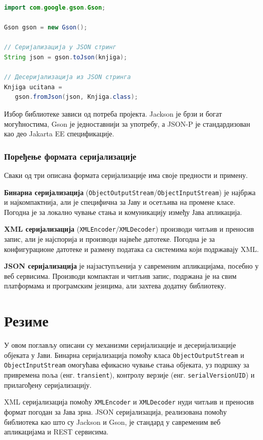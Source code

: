 \begin{lstlisting}[language=Java]
import com.google.gson.Gson;
 
Gson gson = new Gson();
 
// Серијализација у JSON стринг
String json = gson.toJson(knjiga);
 
// Десеријализација из JSON стринга
Knjiga ucitana =
   gson.fromJson(json, Knjiga.class);
\end{lstlisting}


Избор библиотеке зависи од потреба пројекта. Jackson је брзи и богат могућностима, Gson је једноставнији за употребу, а JSON-P је стандардизован као део Jakarta EE спецификације.


\subsubsection{Поређење формата серијализације}

Сваки од три описана формата серијализације има своје предности и примену.

\textbf{Бинарна серијализација} (\texttt{ObjectOutputStream}/\texttt{ObjectInputStream}) је најбржа и најкомпактнија, али је специфична за Јаву и осетљива на промене класе. Погодна је за локално чување стања и комуникацију између Јава апликација.

\textbf{XML серијализација} (\texttt{XMLEncoder}/\texttt{XMLDecoder}) производи читљив и преносив запис, али је најспорија и производи највеће датотеке. Погодна је за конфигурационе датотеке и размену података са системима који подржавају XML.

\textbf{JSON серијализација} је најзаступљенија у савременим апликацијама, посебно у веб сервисима. Производи компактан и читљив запис, подржана је на свим платформама и програмским језицима, али захтева додатну библиотеку.


\section{Резиме}

У овом поглављу описани су механизми серијализације и десеријализације објеката у Јави. Бинарна серијализација помоћу класа \texttt{ObjectOutputStream} и \texttt{ObjectInputStream} омогућава ефикасно чување стања објеката, уз подршку за привремена поља (енг. \texttt{transient}), контролу верзије (енг. \texttt{serialVersionUID}) и прилагођену серијализацију.

XML серијализација помоћу \texttt{XMLEncoder} и \texttt{XMLDecoder} нуди читљив и преносив формат погодан за Јава зрна. JSON серијализација, реализована помоћу библиотека као што су Jackson и Gson, је стандард у савременим веб апликацијама и REST сервисима.

